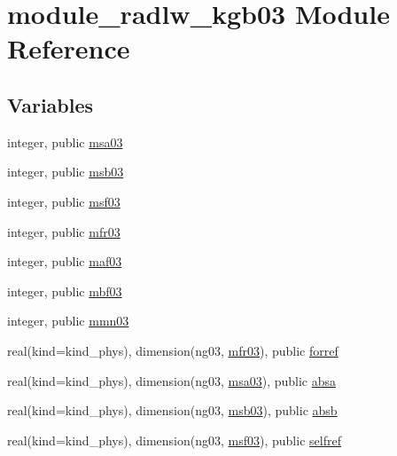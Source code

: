 \hypertarget{namespacemodule__radlw__kgb03}{}\section{module\+\_\+radlw\+\_\+kgb03 Module Reference}
\label{namespacemodule__radlw__kgb03}
\subsection*{Variables}
\begin{DoxyCompactItemize}
\item 
integer, public \hyperlink{namespacemodule__radlw__kgb03_a78658032153f7a4cbeaa198cbe661244}{msa03}
\item 
integer, public \hyperlink{group__module__radlw__main_gac57ba9584cbc3a5e4e2e0a6b548d21e9}{msb03}
\item 
integer, public \hyperlink{group__module__radlw__main_gaf553bb46aa3ea6bcbb945cb2c2778955}{msf03}
\item 
integer, public \hyperlink{group__module__radlw__main_ga4ea1e58a39585adc087718b92a16b529}{mfr03}
\item 
integer, public \hyperlink{group__module__radlw__main_ga90d1081db011f0682cb4a83c40c5bb23}{maf03}
\item 
integer, public \hyperlink{group__module__radlw__main_ga655fff8711d78d62ae9d4fa27d02621a}{mbf03}
\item 
integer, public \hyperlink{group__module__radlw__main_gab4e84b10460930267256c0e5a1fe7a55}{mmn03}
\item 
real(kind=kind\+\_\+phys), dimension(ng03, \hyperlink{group__module__radlw__main_ga4ea1e58a39585adc087718b92a16b529}{mfr03}), public \hyperlink{group__module__radlw__main_gafcc55fa81ba6369b56d29db2342c2e6a}{forref}
\item 
real(kind=kind\+\_\+phys), dimension(ng03, \hyperlink{namespacemodule__radlw__kgb03_a78658032153f7a4cbeaa198cbe661244}{msa03}), public \hyperlink{group__module__radlw__main_gac65fd4afedbd4bfa2c87c5e4f060a1d4}{absa}
\item 
real(kind=kind\+\_\+phys), dimension(ng03, \hyperlink{group__module__radlw__main_gac57ba9584cbc3a5e4e2e0a6b548d21e9}{msb03}), public \hyperlink{group__module__radlw__main_gaa84ba66e0a3cc018b03bd13c9c21e133}{absb}
\item 
real(kind=kind\+\_\+phys), dimension(ng03, \hyperlink{group__module__radlw__main_gaf553bb46aa3ea6bcbb945cb2c2778955}{msf03}), public \hyperlink{group__module__radlw__main_ga6bb40d898660e6dfc056d3efe1d0c544}{selfref}

\end{DoxyCompactItemize}
